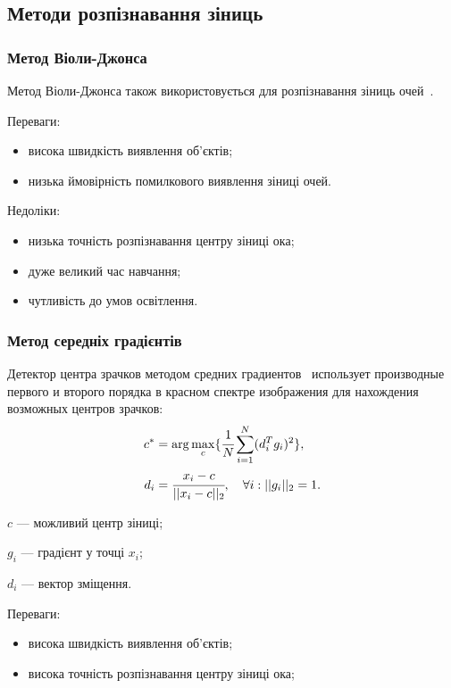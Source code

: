 \subsection{Методи розпізнавання зіниць}
\subsubsection{Метод Віоли-Джонса}
Метод Віоли-Джонса також використовується для розпізнавання зіниць очей~\cite{Violaa}.

Переваги:
\begin{itemize}
	\item висока швидкість виявлення об'єктів;
	\item низька ймовірність помилкового виявлення зіниці очей.
\end{itemize}

Недоліки:
\begin{itemize}
	\item низька точність розпізнавання центру зіниці ока;
	\item дуже великий час навчання;
	\item чутливість до умов освітлення. 
\end{itemize}

\subsubsection{Метод середніх градієнтів}
Детектор центра зрачков методом средних градиентов~\cite{MeansOfGrads2011a} использует производные первого и второго порядка в красном спектре изображения для нахождения возможных центров зрачков:
\begin{align}
c^* &= \arg \max_c \{\cfrac{1}{N} \sum^N_{i=1} (d^T_ig_i)^2\}, \\
d_i &= \cfrac{x_i - c}{||x_i-c||_2}, \quad
\forall i : ||g_i||_2 = 1.
\end{align}
\begin{description}
	\item[де] $c$ --- можливий центр зіниці;
	\item $g_i$ --- градієнт у точці $x_i$;
	\item $d_i$ --- вектор зміщення.
\end{description}

Переваги:
\begin{itemize}
	\item висока швидкість виявлення об'єктів;
	\item висока точність розпізнавання центру зіниці ока;  
\end{itemize}

